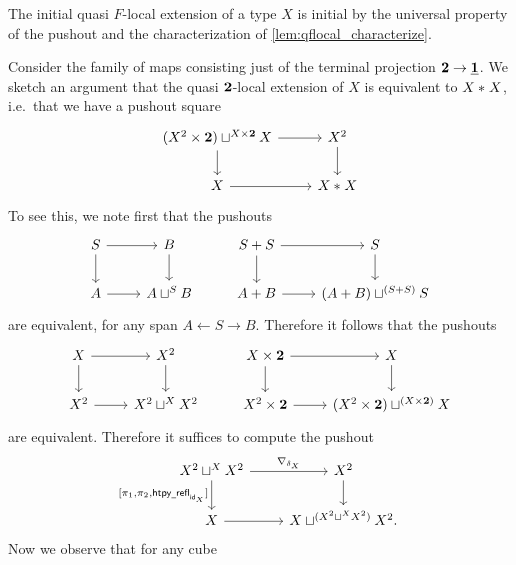 \begin{rmk}
The initial quasi $F$-local extension of a type $X$ is initial by the universal property of the pushout and the characterization of \cref{lem:qflocal_characterize}.
\end{rmk}

\begin{eg}
Consider the family of maps consisting just of the terminal projection $\mathbf{2}\to\underline{\mathbf{1}}$. We sketch an argument that the quasi $\mathbf{2}$-local extension of $X$ is equivalent to ${X}\ast_{}{X}$, i.e.~that we have a pushout square
\begin{equation*}
\begin{tikzcd}
(X^2\times \bool)\sqcup^{X\times \bool} X \arrow[r] \arrow[d] & X^2 \arrow[d] \\
X \arrow[r] & \join{X}{X}
\end{tikzcd}
\end{equation*}
To see this, we note first that the pushouts
\begin{equation*}
\begin{tikzcd}
S \arrow[d] \arrow[r] & B \arrow[d] & S+S \arrow[d] \arrow[r] & S \arrow[d] \\
A \arrow[r] & A \sqcup^S B & A+B \arrow[r] & (A+B)\sqcup^{(S+S)} S
\end{tikzcd}
\end{equation*}
are equivalent, for any span $A \leftarrow S \rightarrow B$. Therefore it follows that the pushouts
\begin{equation*}
\begin{tikzcd}
X \arrow[d] \arrow[r] & X^2 \arrow[d] & X\times \bool \arrow[d] \arrow[r] & X \arrow[d] \\
X^2 \arrow[r] & X^2 \sqcup^X X^2 & X^2\times \bool \arrow[r] & (X^2\times\bool)\sqcup^{(X\times\bool)} X
\end{tikzcd}
\end{equation*}
are equivalent. Therefore it suffices to compute the pushout
\begin{equation*}
\begin{tikzcd}
X^2 \sqcup^X X^2 \arrow[r,"\nabla_{\delta_X}"] \arrow[d,swap,"{[\pi_1,\pi_2,\mathsf{htpy\usc{}refl}_{\idfunc[X]}]}"] & X^2 \arrow[d] \\
X \arrow[r] & X\sqcup^{(X^2 \sqcup^X X^2)}X^2.
\end{tikzcd}
\end{equation*}
Now we observe that for any cube
\begin{equation*}
\begin{tikzcd}

\end{tikzcd}
\end{equation*}
\end{eg}

